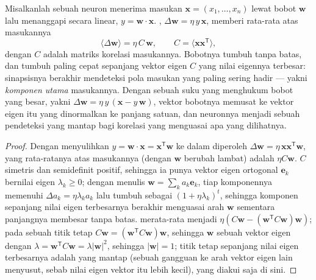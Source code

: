 \begin{theorem}\label{thm:b3:learning-memory:hebb}
Misalkanlah sebuah neuron menerima masukan $\mathbf{x} = (x_{1},\dots,x_{n})$ lewat
bobot $\mathbf{w}$ lalu menanggapi secara linear, $y = \mathbf{w}\cdot\mathbf{x}$.
, $\Delta\mathbf{w} = \eta\, y\,\mathbf{x}$, memberi rata-rata
atas masukannya
\[
\langle\Delta\mathbf{w}\rangle = \eta\,C\,\mathbf{w}, \qquad C =
\langle\mathbf{x}\mathbf{x}^{\mathsf{T}}\rangle ,
\]
dengan $C$ adalah matriks korelasi masukannya. Bobotnya tumbuh
tanpa batas, dan tumbuh paling cepat sepanjang vektor eigen $C$ yang
nilai eigennya terbesar: sinapsisnya berakhir mendeteksi pola masukan
yang paling sering hadir --- yakni \emph{komponen utama}
masukannya. Dengan sebuah suku yang menghukum bobot yang besar, yakni \emph{}
$\Delta\mathbf{w} = \eta\, y\,(\mathbf{x} - y\,\mathbf{w})$, vektor bobotnya
memusat ke vektor eigen itu yang dinormalkan ke panjang satuan, dan
neuronnya menjadi sebuah pendeteksi yang mantap bagi korelasi yang menguasai apa yang
dilihatnya.
\end{theorem}
\begin{proof}
Dengan menyulihkan $y = \mathbf{w}\cdot\mathbf{x} = \mathbf{x}^{\mathsf{T}}
\mathbf{w}$ ke dalam  diperoleh $\Delta\mathbf{w} = \eta\,\mathbf{x}
\mathbf{x}^{\mathsf{T}}\mathbf{w}$, yang rata-ratanya atas masukannya (dengan
$\mathbf{w}$ berubah lambat) adalah $\eta C\mathbf{w}$. $C$ simetris dan
semidefinit positif, sehingga ia punya vektor eigen ortogonal $\mathbf{e}_{k}$
bernilai eigen $\lambda_{k} \ge 0$; dengan menulis $\mathbf{w} = \sum_{k}
a_{k}\mathbf{e}_{k}$, tiap komponennya memenuhi $\Delta a_{k} = \eta\lambda_{k}
a_{k}$ lalu tumbuh sebagai $(1 + \eta\lambda_{k})^{t}$, sehingga komponen sepanjang
nilai eigen terbesarnya berakhir menguasai arah $\mathbf{w}$
sementara panjangnya membesar tanpa batas.  merata-rata menjadi $\eta(C\mathbf{w} -
(\mathbf{w}^{\mathsf{T}}C\mathbf{w})\mathbf{w})$; pada sebuah titik tetap
$C\mathbf{w} = (\mathbf{w}^{\mathsf{T}}C\mathbf{w})\mathbf{w}$, sehingga
$\mathbf{w}$ sebuah vektor eigen dengan $\lambda = \mathbf{w}^{\mathsf{T}}
C\mathbf{w} = \lambda|\mathbf{w}|^{2}$, sehingga $|\mathbf{w}| = 1$; titik
tetap sepanjang nilai eigen terbesarnya adalah yang mantap (sebuah
gangguan ke arah vektor eigen lain menyusut, sebab nilai eigen vektor
itu lebih kecil), yang diakui saja di sini.
\end{proof}

